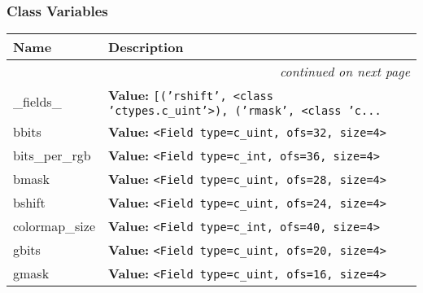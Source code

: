 
  \subsubsection{Class Variables}

    \vspace{-1cm}
\hspace{\varindent}\begin{longtable}{|p{\varnamewidth}|p{\vardescrwidth}|l}
\cline{1-2}
\cline{1-2} \centering \textbf{Name} & \centering \textbf{Description}& \\
\cline{1-2}
\endhead\cline{1-2}\multicolumn{3}{r}{\small\textit{continued on next page}}\\\endfoot\cline{1-2}
\endlastfoot\raggedright \_\-f\-i\-e\-l\-d\-s\-\_\- & \raggedright \textbf{Value:} 
{\tt \texttt{[}\texttt{(}\texttt{'}\texttt{rshift}\texttt{'}\texttt{, }{\textless}class 'ctypes.c\_uint'{\textgreater}\texttt{)}\texttt{, }\texttt{(}\texttt{'}\texttt{rmask}\texttt{'}\texttt{, }{\textless}class 'c\texttt{...}}&\\
\cline{1-2}
\raggedright b\-b\-i\-t\-s\- & \raggedright \textbf{Value:} 
{\tt {\textless}Field type=c\_uint, ofs=32, size=4{\textgreater}}&\\
\cline{1-2}
\raggedright b\-i\-t\-s\-\_\-p\-e\-r\-\_\-r\-g\-b\- & \raggedright \textbf{Value:} 
{\tt {\textless}Field type=c\_int, ofs=36, size=4{\textgreater}}&\\
\cline{1-2}
\raggedright b\-m\-a\-s\-k\- & \raggedright \textbf{Value:} 
{\tt {\textless}Field type=c\_uint, ofs=28, size=4{\textgreater}}&\\
\cline{1-2}
\raggedright b\-s\-h\-i\-f\-t\- & \raggedright \textbf{Value:} 
{\tt {\textless}Field type=c\_uint, ofs=24, size=4{\textgreater}}&\\
\cline{1-2}
\raggedright c\-o\-l\-o\-r\-m\-a\-p\-\_\-s\-i\-z\-e\- & \raggedright \textbf{Value:} 
{\tt {\textless}Field type=c\_int, ofs=40, size=4{\textgreater}}&\\
\cline{1-2}
\raggedright g\-b\-i\-t\-s\- & \raggedright \textbf{Value:} 
{\tt {\textless}Field type=c\_uint, ofs=20, size=4{\textgreater}}&\\
\cline{1-2}
\raggedright g\-m\-a\-s\-k\- & \raggedright \textbf{Value:} 
{\tt {\textless}Field type=c\_uint, ofs=16, size=4{\textgreater}}&\\

\end{longtable}

